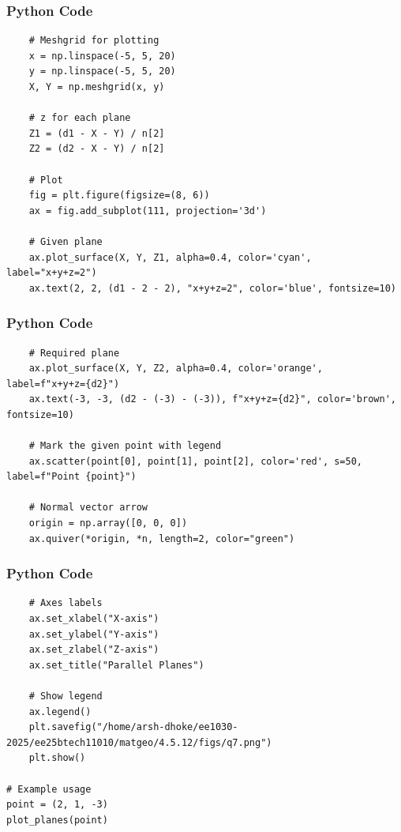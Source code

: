 \documentclass{beamer}
\begin{document}
\begin{frame}[fragile]
    \frametitle{Python Code}
\begin{lstlisting}
    # Meshgrid for plotting
    x = np.linspace(-5, 5, 20)
    y = np.linspace(-5, 5, 20)
    X, Y = np.meshgrid(x, y)
    
    # z for each plane
    Z1 = (d1 - X - Y) / n[2]
    Z2 = (d2 - X - Y) / n[2]
    
    # Plot
    fig = plt.figure(figsize=(8, 6))
    ax = fig.add_subplot(111, projection='3d')
    
    # Given plane
    ax.plot_surface(X, Y, Z1, alpha=0.4, color='cyan', label="x+y+z=2")
    ax.text(2, 2, (d1 - 2 - 2), "x+y+z=2", color='blue', fontsize=10)
 \end{lstlisting}
\end{frame}
    
    \begin{frame}[fragile]
    \frametitle{Python Code}
\begin{lstlisting}
    # Required plane
    ax.plot_surface(X, Y, Z2, alpha=0.4, color='orange', label=f"x+y+z={d2}")
    ax.text(-3, -3, (d2 - (-3) - (-3)), f"x+y+z={d2}", color='brown', fontsize=10)
    
    # Mark the given point with legend
    ax.scatter(point[0], point[1], point[2], color='red', s=50, label=f"Point {point}")
    
    # Normal vector arrow
    origin = np.array([0, 0, 0])
    ax.quiver(*origin, *n, length=2, color="green")
    \end{lstlisting}
\end{frame}

\begin{frame}[fragile]
    \frametitle{Python Code}
\begin{lstlisting}
    # Axes labels
    ax.set_xlabel("X-axis")
    ax.set_ylabel("Y-axis")
    ax.set_zlabel("Z-axis")
    ax.set_title("Parallel Planes")
    
    # Show legend
    ax.legend()
    plt.savefig("/home/arsh-dhoke/ee1030-2025/ee25btech11010/matgeo/4.5.12/figs/q7.png")
    plt.show()

# Example usage
point = (2, 1, -3)  
plot_planes(point)

\end{lstlisting}
\end{frame}
\end{document}
